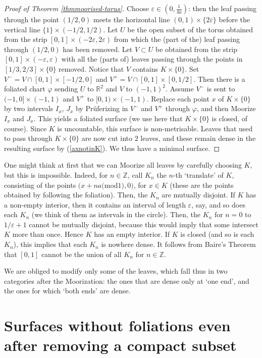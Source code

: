 \documentclass{amsart}
\begin{document}
\begin{proof}[Proof of Theorem \ref{thmmoorised-torus}]
Choose $\varepsilon\in(0,\frac{1}{4a})$: then the leaf passing through the point $(1/2, 0)$ meets the horizontal line $(0,1)\times\{2\varepsilon\}$ before the vertical line $\{1\}\times(-1/2,1/2)$. Let $U$ be the open subset of the torus obtained from the strip $[0,1]\times(-2\varepsilon,2\varepsilon)$ from which the (part of the) leaf passing through $(1/2, 0)$ has been removed. Let $V\subset U$ be obtained from the strip $[0,1]\times(-\varepsilon,\varepsilon)$ with all the (parts of) leaves passing through the points in $[1/3,2/3]\times\{0\}$ removed. Notice that $V$ contains $K\times\{0\}$. Set $V^-=V\cap[0,1]\times[-1/2,0]$ and $V^+=V\cap[0,1]\times[0,1/2]$. Then there is a foliated chart $\varphi$ sending $U$ to ${\mathbb R}^2$ and $V$ to $(-1,1)^2$. Assume $V^-$ is sent to $(-1,0]\times(-1,1)$ and $V^+$ to $[0,1)\times(-1,1)$. Replace each point $x$ of $K\times\{0\}$ by two intervals $I_x$, $J_x$ by Pr\"uferizing in $V^-$ and $V^+$ through $\varphi$, and then Moorize $I_x$ and $J_x$. This yields a foliated surface (we use here that $K\times\{0\}$ is closed, of course). Since $K$ is uncountable, this surface is non-metrisable. Leaves that used to pass through $K\times\{0\}$ are now cut into $2$ leaves, and these remain dense in the resulting surface by (\ref{axnotinK}). We thus have a minimal surface. 
\end{proof}

One might think at first that we can Moorize all leaves by carefully choosing $K$, but this is impossible. Indeed,  for $n\in \mathbb{Z}$, call $K_n$ the $n$-th `translate' of $K$, consisting of the points $(x + na ($mod$1), 0)$, for $x\in K$ (these are the points obtained by following the foliation). Then, the $K_n$ are mutually disjoint. If $K$ has a non-empty interior, then it contains an interval of length $\varepsilon$, say, and so does each $K_n$ (we think of them as intervals in the circle). Then, the $K_n$ for $n = 0$ to $1/\varepsilon + 1$ cannot be mutually disjoint, because this would imply that some intersect $K$ more than once. Hence $K$ has an empty interior. If $K$ is closed (and so is each $K_n$), this implies that each $K_n$ is nowhere dense. It follows from Baire's Theorem that $[0,1]$ cannot be the union of all $K_n$ for $n \in \mathbb{Z}$.

We are obliged to modify only some of the leaves, which fall thus in two categories after the Moorization: the ones that are dense only at `one end', and the ones for which `both ends' are dense.

\section{Surfaces without foliations even after removing a compact subset}
\end{document}
